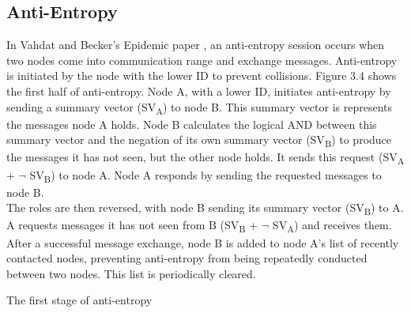 \documentclass[12pt,a4paper]{report}
\makeatletter
\newenvironment{figurehere}
  {\def\@captype{figure}}
  {}
\makeatother
\begin{document}
\subsection{Anti-Entropy}
In Vahdat and Becker's Epidemic paper \cite{epidemic}, an anti-entropy session occurs when two nodes come into communication range and exchange messages. Anti-entropy is initiated by the node with the lower ID to prevent collisions. Figure 3.4 shows the first half of anti-entropy. Node A, with a lower ID, initiates anti-entropy by sending a summary vector (SV\textsubscript{A}) to node B. This summary vector is represents the messages node A holds. Node B calculates the logical AND between this summary vector and the negation of its own summary vector (SV\textsubscript{B}) to produce the messages it has not seen, but the other node holds. It sends this request (SV\textsubscript{A} + $\neg$ SV\textsubscript{B}) to node A. Node A responds by sending the requested messages to node B. \\
The roles are then reversed, with node B sending its summary vector (SV\textsubscript{B}) to A. A requests messages it has not seen from B (SV\textsubscript{B} + $\neg$ SV\textsubscript{A}) and receives them. \\
After a successful message exchange, node B is added to node A's list of recently contacted nodes, preventing anti-entropy from being repeatedly conducted between two nodes. This list is periodically cleared. \\
\begin{figurehere} 
\begin{center}
\end{center}
\caption{The first stage of anti-entropy \cite{epidemic}}
\end{figurehere}
\end{document}
